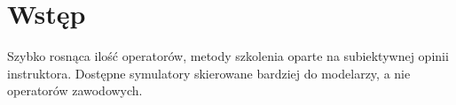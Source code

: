 \newpage %
\section{Wstęp}
\begin{todo}
    Szybko rosnąca ilość operatorów, metody szkolenia oparte na subiektywnej opinii instruktora. Dostępne symulatory skierowane bardziej do modelarzy, a nie operatorów zawodowych.
\end{todo}